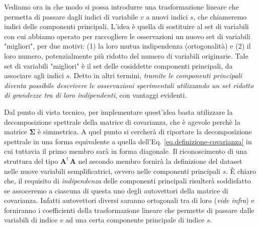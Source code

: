 \documentclass[11pt]{amsart}
\begin{document}
Vediamo ora in che modo si possa introdurre una trasformazione lineare che permetta di passare dagli indici di variabile $v$ a nuovi indici $s$, che chiameremo indici delle componenti principali. L'idea è quella di sostituire al set di variabili con cui abbiamo operato per raccogliere le osservazioni un nuovo set di variabili "migliori", per due motivi: (1) la loro mutua indipendenza (ortogonalità) e (2) il loro numero, potenzialmente più ridotto del numero di variabili originarie. Tale set di variabili "migliori" è il set delle cosiddette componenti principali, da associare agli indici $s$.
Detto in altri termini, {\em tramite le componenti principali diventa possibile descrivere le osservazioni sperimentali utilizzando un set ridotto di grandezze tra di loro indipendenti}, con vantaggi evidenti.

Dal punto di vista tecnico, per implementare quest'idea basta utilizzare la decomposizione spettrale della matrice di covarianza, che è agevole perchè la matrice $\bm \Sigma$ è simmetrica. A quel punto si cercherà di riportare la decomposizione spettrale in una forma equivalente a quella dell'Eq. \ref{eq.definizione-covarianza} in cui tuttavia il primo membro sarà in forma diagonale. Il riconoscimento di una struttura del tipo $\bm A^t \, \bm A$ nel secondo membro fornirà la definizione del dataset nelle nuove variabili semplificatrici, ovvero nelle componenti principali $s$. È chiaro che, il requisito di {\em indipendenza} delle componenti principali risulterà soddisfatto se assoceremo a ciascuna di questa uno degli autovettori della matrice di covarianza. Infatti autovettori diversi saranno ortogonali tra di loro ({\em vide infra}) e forniranno i coefficienti della trasformazione lineare che permette di passare dalle variabili di indice $v$ ad una certa componente principale di indice $s$.
\end{document}
